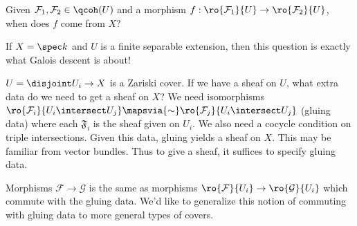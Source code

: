 \begin{question}

Given \(\mathcal{F}_1, \mathcal{F}_2 \in \qcoh(U)\) and a morphism
\(f: \ro{\mathcal{F}_1}{U} \to \ro{\mathcal{F}_2}{U}\), when does \(f\)
come from \(X\)?

\end{question}

\begin{remark}

If \(X = \spec k\) and \(U\) is a finite separable extension, then this
question is exactly what Galois descent is about!

\end{remark}

\begin{example}

\(U = \disjoint U_i \to X\) is a Zariski cover. If we have a sheaf on
\(U\), what extra data do we need to get a sheaf on \(X\)? We need
isomorphisms
\(\ro{\mathcal{F}_i }{U_i\intersect U_j} \mapsvia{\sim} \ro{\mathcal{F}_j}{U_i\intersect U_j}\)
(gluing data) where each \(\mathfrak{F}_i\) is the sheaf given on
\(U_i\). We also need a cocycle condition on triple intersections. Given
this data, gluing yields a sheaf on \(X\). This may be familiar from
vector bundles. Thus to give a sheaf, it suffices to specify gluing
data.

Morphisms \(\mathcal{F}\to \mathcal{G}\) is the same as morphisms
\(\ro{\mathcal{F}}{U_i} \to \ro{\mathcal{G}}{U_i}\) which commute with
the gluing data. We'd like to generalize this notion of commuting with
gluing data to more general types of covers.

\end{example}

